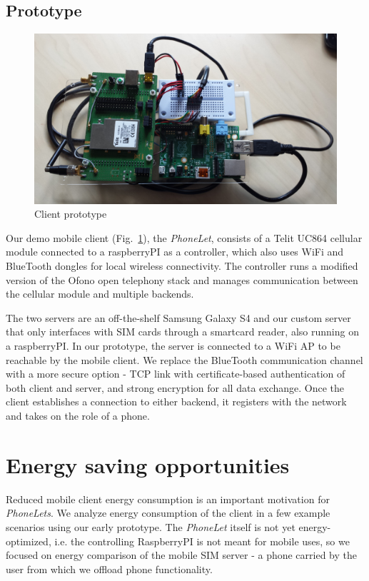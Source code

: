 \documentclass{sig-alternate-10pt}
\begin{document}
\subsection{Prototype}

\begin{figure}[t!]
\centering
\includegraphics[width=0.9\columnwidth]{figs/client}
\caption{Client prototype}
\label{fig:client}
\end{figure}

Our demo mobile client (Fig.~\ref{fig:client}), the \emph{PhoneLet}, consists of a Telit UC864 cellular module connected to a raspberryPI as a controller, which also uses WiFi and BlueTooth dongles for local wireless connectivity. The controller runs a modified version of the Ofono open telephony stack and manages communication between the cellular module and multiple backends.

The two servers are an off-the-shelf Samsung Galaxy S4 and our custom server that only interfaces with SIM cards through a smartcard reader, also running on a raspberryPI. In our prototype, the server is connected to a WiFi AP to be reachable by the mobile client. We replace the BlueTooth communication channel with a more secure option - TCP link with certificate-based authentication of both client and server, and strong encryption for all data exchange. Once the client establishes a connection to either backend, it registers with the network and takes on the role of a phone.

\section{Energy saving opportunities}
\label{sec:energy}

Reduced mobile client energy consumption is an important motivation for \emph{PhoneLets}. We analyze energy consumption of the client in a few example scenarios using our early prototype. The \emph{PhoneLet} itself is not yet energy-optimized, i.e. the controlling RaspberryPI is not meant for mobile uses, so we focused on energy comparison of the mobile SIM server - a phone carried by the user from which we offload phone functionality.
\end{document}
